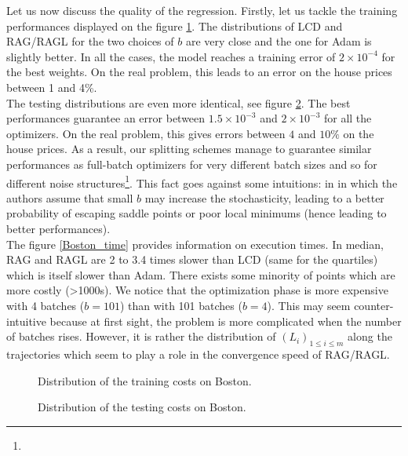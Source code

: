 Let us now discuss the quality of the regression. Firstly, let us tackle the training performances displayed on the figure \ref{Boston_train}. The distributions of LCD and RAG/RAGL for the two choices of $b$ are very close and the one for Adam is slightly better. In all the cases, the model reaches a training error of $2 \times 10^{-4}$ for the best weights. On the real problem, this leads to an error on the house prices between 1 and 4\%. \\
The testing distributions are even more identical, see figure \ref{Boston_test}. The best performances guarantee an error between $1.5 \times 10^{-3}$ and $2 \times 10^{-3}$ for
all the optimizers. On the real problem, this gives errors between $4$ and $10\%$ on the house prices. As a result, our splitting schemes manage to guarantee similar performances
as full-batch optimizers for very different batch sizes and so for different noise structures\footnote{}. This fact goes against some 
intuitions: in
\cite{sgd_escape1,sgd_escape2} in which the authors assume that small $b$ may increase the stochasticity, leading to a better probability of escaping saddle points or poor local
minimums  (hence leading to better performances).\\
The figure \ref{Boston_time} provides information on execution times. In median, RAG and RAGL are 2 to 3.4 times slower than LCD (same for the quartiles) which is itself slower
than Adam. There exists some minority of points which are more costly (>1000s). We notice that the optimization phase is more expensive with 4 batches ($b=101$) than with 101
batches ($b=4$). This may seem counter-intuitive because at first sight, the problem is more complicated when the number of batches rises. However, it is rather the distribution of
$(L_i)_{1\leq i \leq m}$ along the trajectories which seem to play a role in the convergence speed of RAG/RAGL.    

\begin{figure}[h!]
	\centering
	\scalebox{0.9}{}
	\caption{Distribution of the training costs on Boston.}
	\label{Boston_train}
\end{figure}

\begin{figure}[h!]
	\centering
	\scalebox{0.9}{}
	\caption{Distribution of the testing costs on Boston.}
	\label{Boston_test}
\end{figure}

